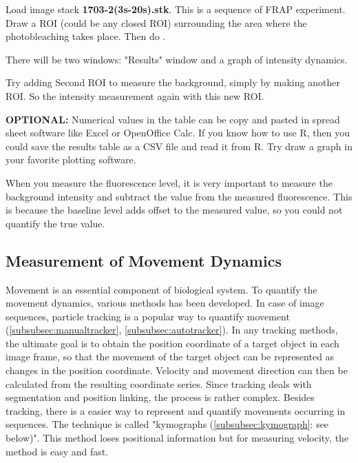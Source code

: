 \begin{indentexercise}{1}
Load image stack \textbf{1703-2(3s-20s).stk}. This is a sequence of FRAP
experiment. Draw a ROI (could be any closed ROI) surrounding the area where the
photobleaching takes place. Then do .

There will be two windows: "Results" window and a graph of intensity dynamics. 

Try adding Second ROI to measure the background, simply by making another ROI. 
So the intensity measurement again with this new ROI. 

\textbf{OPTIONAL:} Numerical values in the table can be copy and pasted 
in spread sheet software like Excel or OpenOffice Calc. If you know how to use
R, then you could save the results table as a CSV file and read it from R. Try
draw a graph in your favorite plotting software.
\end{indentexercise}

When you measure the fluorescence level, it is very important to measure the
background intensity and subtract the value from the measured
fluorescence. This is because the baseline level adds offset to the
measured value, so you could not quantify the true value.

\subsection{Measurement of Movement Dynamics}

Movement is an essential component of biological system. To quantify the
movement dynamics, various methods has been developed. In case of image
sequences, particle tracking is a popular way to quantify movement
(\ref{subsubsec:manualtracker}, \ref{subsubsec:autotracker}). 
In any tracking methods, the ultimate goal is to obtain
the position coordinate of a target object in each image frame, so that
the movement of the target object can be represented as changes in the
position coordinate. Velocity and movement direction can then be
calculated from the resulting coordinate series. Since tracking deals
with segmentation and position linking, the process is rather complex.
Besides tracking, there is a easier way to represent and quantify
movements occurring in sequences. The technique is called
"kymographs (\ref{subsubsec:kymograph}: see below)".
This method loses positional information but for measuring velocity,
the method is easy and fast. \\ 


